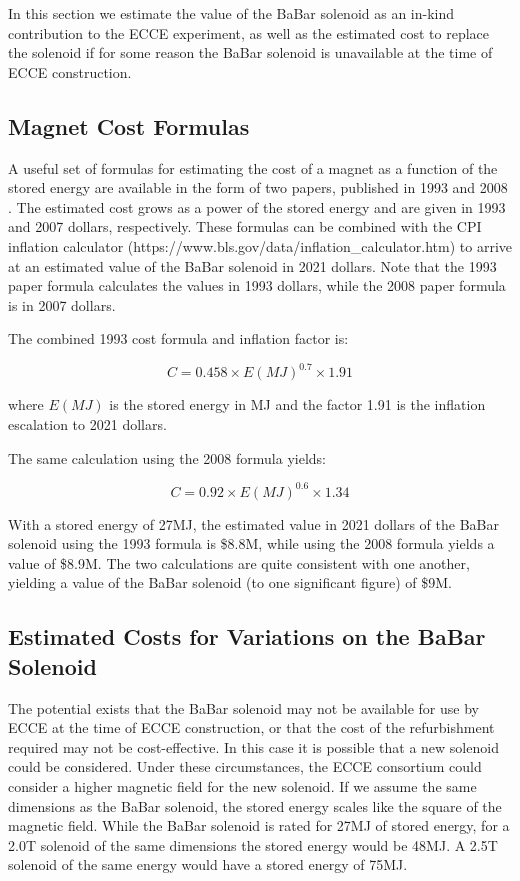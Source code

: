 In this section we estimate the value of the BaBar solenoid as an in-kind contribution to the ECCE experiment, as well as the estimated cost to replace the solenoid if for some reason the BaBar solenoid is unavailable at the time of ECCE construction. 

\subsection{Magnet Cost Formulas}

A useful set of formulas for estimating the cost of a magnet as a function of the stored energy are available in the form of two papers, published in 1993 and 2008 \cite{Green1993,Green2008}. The estimated cost grows as a power of the stored energy and are given in 1993 and 2007 dollars, respectively. These formulas can be combined with the CPI inflation calculator (https://www.bls.gov/data/inflation\_calculator.htm) to arrive at an estimated value of the BaBar solenoid in 2021 dollars. Note that the 1993 paper formula calculates the values in 1993 dollars, while the 2008 paper formula is in 2007 dollars. 

The combined 1993 cost formula and inflation factor is: 

\begin{equation}
    C = 0.458 \times E(MJ)^{0.7} \times 1.91
\end{equation}

\noindent where $E(MJ)$ is the stored energy in MJ and the factor 1.91 is the inflation escalation to 2021 dollars. 

The same calculation using the 2008 formula yields: 

\begin{equation}
    C = 0.92 \times E(MJ)^{0.6} \times 1.34
    \label{eq:2008}
\end{equation}

With a stored energy of 27MJ, the estimated value in 2021 dollars of the BaBar solenoid using the 1993 formula is \$8.8M, while using the 2008 formula yields a value of \$8.9M. The two calculations are quite consistent with one another, yielding a value of the BaBar solenoid (to one significant figure) of \$9M. 


\subsection{Estimated Costs for Variations on the BaBar Solenoid}

The potential exists that the BaBar solenoid may not be available for use by ECCE at the time of ECCE construction, or that the cost of the refurbishment required may not be cost-effective. In this case it is possible that a new solenoid could be considered. Under these circumstances, the ECCE consortium could consider a higher magnetic field for the new solenoid. 
If we assume the same dimensions as the BaBar solenoid, the stored energy scales like the square of the magnetic field. While the BaBar solenoid is rated for 27MJ of stored energy, for a 2.0T solenoid of the same dimensions the stored energy would be 48MJ.  A 2.5T solenoid of the same energy would have a stored energy of 75MJ. 

